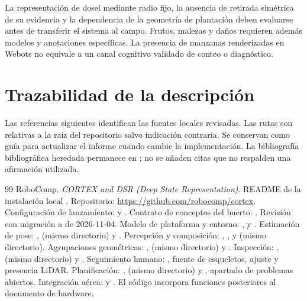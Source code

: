 La representación de dosel mediante radio fijo, la ausencia de retirada simétrica de su evidencia y la dependencia de la geometría de plantación deben evaluarse antes de transferir el sistema al campo. Frutos, malezas y daños requieren además modelos y anotaciones específicas. La presencia de manzanas renderizadas en Webots no equivale a un canal cognitivo validado de conteo o diagnóstico.

\section{Trazabilidad de la descripción}
Las referencias siguientes identifican las fuentes locales revisadas. Las rutas son relativas a la raíz del repositorio salvo indicación contraria. Se conservan como guía para actualizar el informe cuando cambie la implementación. La bibliografía bibliográfica heredada permanece en ; no se añaden citas que no respalden una afirmación utilizada.
\begin{thebibliography}{99}
 RoboComp. \emph{CORTEX and DSR (Deep State Representation)}. README de la instalación local . Repositorio: \url{https://github.com/robocomp/cortex}.
 Configuración de lanzamiento:  y .
 Contrato de conceptos del huerto: . Revisión con migración a  de 2026-11-04.
 Modelo de plataforma y entorno: ,  y .
 Estimación de pose: ,  (mismo directorio) y .
 Percepción y composición: , ,  y  (mismo directorio).
 Agrupaciones geométricas: ,  (mismo directorio) y .
 Inspección: ,  (mismo directorio) y .
 Seguimiento humano: , fuente de esqueletos, ajuste y presencia LiDAR.
 Planificación: ,  (mismo directorio) y , apartado de problemas abiertos.
 Integración aérea:  y . El código incorpora funciones posteriores al documento de hardware.
\end{thebibliography}
